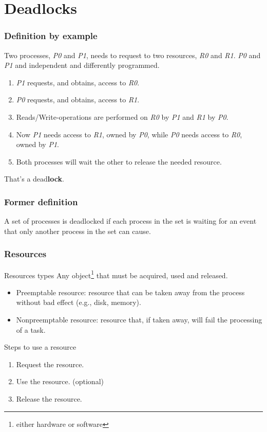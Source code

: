 \section{Deadlocks}

\begin{frame}
  \frametitle{Definition by example}
  Two processes, \emph{P0} and \emph{P1}, needs to request to two resources, \emph{R0} and \emph{R1}. \emph{P0} and \emph{P1} and independent and differently programmed.
  \begin{enumerate}
    \item \emph{P1} requests, and obtains, access to \emph{R0}.
    \item \emph{P0} requests, and obtains, access to \emph{R1}.
    \item Reads/Write-operations are performed on \emph{R0} by \emph{P1} and \emph{R1} by \emph{P0}.
    \item Now \emph{P1} needs access to \emph{R1}, owned by \emph{P0}, while \emph{P0} needs access to \emph{R0}, owned by \emph{P1}.
    \item Both processes will wait the other to release the needed resource.
  \end{enumerate}
  \begin{center}
    That's a dead\textbf{lock}.
  \end{center}
\end{frame}

\begin{frame}
  \frametitle{Former definition}
  \begin{center}
    A set of processes is deadlocked if each process in the set is waiting for an event that only another process in the set can cause.
  \end{center}
\end{frame}

\begin{frame}
  \frametitle{Resources}
  \begin{block}{Resources types}
    Any object\footnote{either hardware or software} that must be acquired, used and released.
    \begin{itemize}
      \item Preemptable resource: resource that can be taken away from the process without bad effect (e.g., disk, memory).
      \item Nonpreemptable resource: resource that, if taken away, will fail the processing of a task.
    \end{itemize}
  \end{block}
  \begin{block}{Steps to use a resource}
    \begin{enumerate}
      \item Request the resource.
      \item Use the resource. (optional)
      \item Release the resource.
    \end{enumerate}
  \end{block}
\end{frame}

